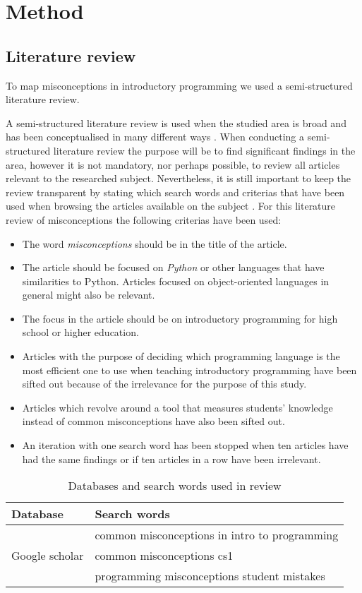 \mode*
\section{Method}

\subsection{Literature review}

To map misconceptions in introductory programming we used a semi-structured 
literature review.

A semi-structured literature review is used when the studied area is broad and 
has been conceptualised in many different ways \parencite{Snyder2019}. When 
conducting a semi-structured literature review the purpose will be to find 
significant findings in the area, however it is not mandatory, nor perhaps 
possible, to review all articles relevant to the researched subject. 
Nevertheless, it is still important to keep the review transparent by stating 
which search words and criterias that have been used when browsing the articles 
available on the subject \parencite{Snyder2019}.
For this literature review of misconceptions the following criterias have 
been used:
\begin{itemize}
\item The word \emph{misconceptions} should be in the title of the article.
\item The article should be focused on \emph{Python} or other languages that 
have similarities to Python. Articles focused on object-oriented languages 
in 
general might also be relevant.
\item The focus in the article should be on introductory programming for 
high 
school or higher education.
\item Articles with the purpose of deciding which programming language is 
the 
most efficient one to use when teaching introductory programming have been 
sifted out because of the irrelevance for the purpose of this study.
\item Articles which revolve around a tool that measures students' knowledge 
instead of common misconceptions have also been sifted out.
\item An iteration with one search word has been stopped when ten articles 
have had the same findings or if ten articles in a row have been irrelevant.
\end{itemize}
\begin{table}[h]
\centering
\begin{tabular}{ll}
\toprule
Database & Search words\\
\midrule
\multirow{3}{4em}{Google scholar} & common misconceptions in intro to 
programming \\
& common misconceptions cs1 \\
& programming misconceptions student mistakes \\
\bottomrule
\end{tabular}
\caption{Databases and search words used in review}
\label{databasesandwords}
\end{table}
